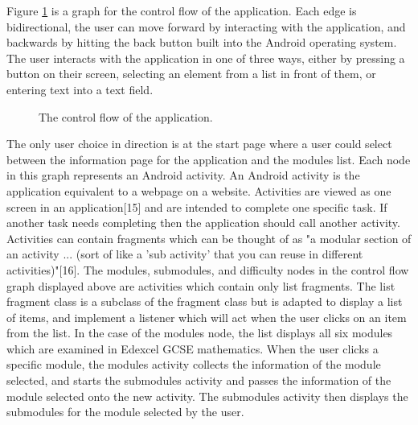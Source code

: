 \documentclass{article}
\begin{document}
Figure \ref{figure:applicationControlFlow} is a graph for the control flow of the application. Each edge is bidirectional, the user can move forward by interacting with the application, and backwards by hitting the back button built into the Android operating system. The user interacts with the application in one of three ways, either by pressing a button on their screen, selecting an element from a list in front of them, or entering text into a text field. \par

\begin{figure}[H]
	\centering
	\caption{The control flow of the application.}
	\label{figure:applicationControlFlow}
\end{figure}

The only user choice in direction is at the start page where a user could select between the information page for the application and the modules list. Each node in this graph represents an Android activity. An Android activity is the application equivalent to a webpage on a website. Activities are viewed as one screen in an application[15] and are intended to complete one specific task. If another task needs completing then the application should call another activity. Activities can contain fragments which can be thought of as "a modular section of an activity ... (sort of like a 'sub activity' that you can reuse in different activities)"[16]. The modules, submodules, and difficulty nodes in the control flow graph displayed above are activities which contain only list fragments. The list fragment class is a subclass of the fragment class but is adapted to display a list of items, and implement a listener which will act when the user clicks on an item from the list. In the case of the modules node, the list displays all six modules which are examined in Edexcel GCSE mathematics. When the user clicks a specific module, the modules activity collects the information of the module selected, and starts the submodules activity and passes the information of the module selected onto the new activity. The submodules activity then displays the submodules for the module selected by the user. \par
\end{document}
